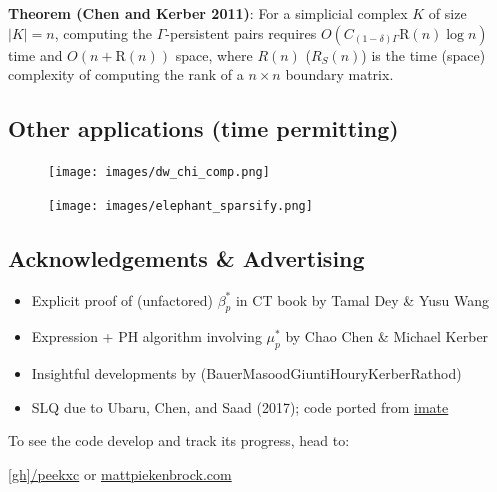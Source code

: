 \documentclass[
  letterpaper,
  DIV=11,
  numbers=noendperiod,
  oneside]{scrartcl}
\providecommand{\tightlist}{%
  \setlength{\itemsep}{0pt}\setlength{\parskip}{0pt}}\usepackage{longtable,booktabs,array}
\begin{document}
\textbf{Theorem (Chen and Kerber 2011)}: For a simplicial complex \(K\)
of size \(\lvert K \rvert = n\), computing the \(\Gamma\)-persistent
pairs requires \(O(C_{(1-\delta)\Gamma}\mathrm{R}(n) \log n)\) time and
\(O(n + \mathrm{R}(n))\) space, where \(R(n)\) (\(R_S(n)\)) is the time
(space) complexity of computing the rank of a \(n \times n\) boundary
matrix.

\subsection{Other applications (time
permitting)}\label{other-applications-time-permitting}

\begin{figure}

{\centering \texttt{[image: images/dw\_chi\_comp.png]}

}

\end{figure}

\begin{figure}

{\centering \texttt{[image: images/elephant\_sparsify.png]}

}

\end{figure}

\subsection{Acknowledgements \&
Advertising}\label{acknowledgements-advertising}

\begin{itemize}
\tightlist
\item
  Explicit proof of (unfactored) \(\beta_p^{\ast}\) in CT book by Tamal
  Dey \& Yusu Wang
\item
  Expression + PH algorithm involving \(\mu_p^\ast\) by Chao Chen \&
  Michael Kerber
\item
  Insightful developments by
  (Bauer\textbar Masood\textbar Giunti\textbar Houry\textbar Kerber\textbar Rathod)
\item
  SLQ due to Ubaru, Chen, and Saad (2017); code ported from
  \href{https://ameli.github.io/imate/}{imate}
\end{itemize}

To see the code develop and track its progress, head to:

\href{https://github.com/peekxc}{{[}gh{]}/peekxc} or
\href{https://mattpiekenbrock.com/}{mattpiekenbrock.com}
\end{document}
